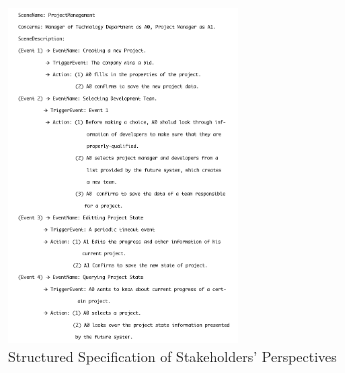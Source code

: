 ﻿\documentclass{beamer}
\begin{document}
\begin{frame}          %
  \begin{figure}
    \includegraphics[width=2.4in]{img/3.PNG}
    \caption{Structured Specification of Stakeholders' Perspectives}
  \end{figure}
\end{frame}
\end{document}
